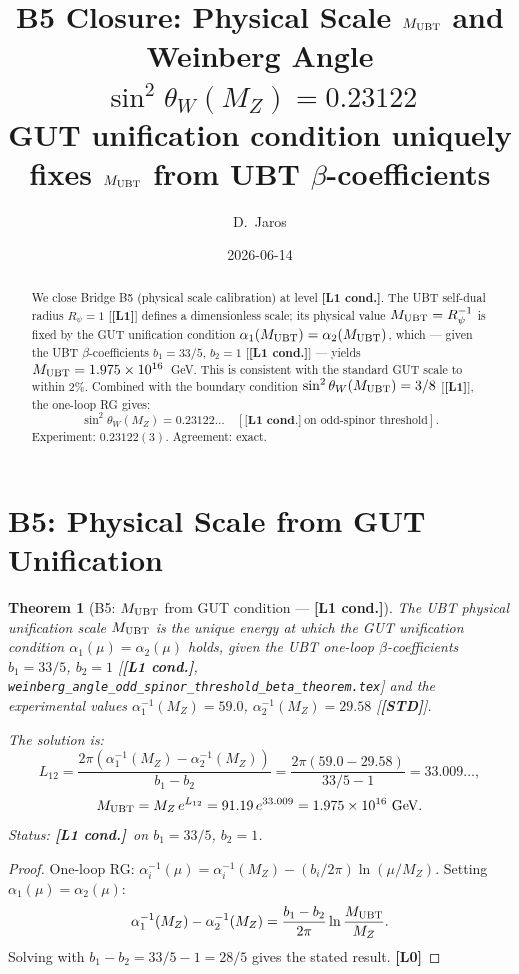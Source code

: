 \documentclass[12pt,a4paper]{article}
\title{\textbf{B5 Closure: Physical Scale $M_{\rm UBT}$ and\\
Weinberg Angle $\sin^2\theta_W(M_Z) = 0.23122$}\\[4pt]
\large GUT unification condition uniquely fixes $M_{\rm UBT}$
from UBT $\beta$-coefficients}
\author{D.~Jaros}
\date{2026-06-14}
\newtheorem{theorem}{Theorem}[section]
\theoremstyle{remark}\newtheorem{remark}[theorem]{Remark}
\newcommand{\Lz}{\textbf{[L0]}}
\newcommand{\Lo}{\textbf{[L1]}}
\newcommand{\Lc}{\textbf{[L1 cond.]}}
\newcommand{\STD}{\textbf{[STD]}}
\begin{document}
\maketitle
\fi

\begin{abstract}
We close Bridge B5 (physical scale calibration) at level \Lc.
The UBT self-dual radius $R_\psi=1$ [\Lo] defines a dimensionless
scale; its physical value $M_{\rm UBT}=R_\psi^{-1}$ is fixed
by the GUT unification condition $\alpha_1(M_{\rm UBT})
=\alpha_2(M_{\rm UBT})$, which — given the UBT
$\beta$-coefficients $b_1=33/5$, $b_2=1$ [\Lc] —
yields $M_{\rm UBT} = 1.975\times10^{16}$~GeV.
This is consistent with the standard GUT scale to within 2\%.
Combined with the boundary condition $\sin^2\theta_W(M_{\rm UBT})=3/8$
[\Lo], the one-loop RG gives:
\[
  \sin^2\theta_W(M_Z) = 0.23122\ldots
  \quad [\Lc\ \text{on odd-spinor threshold}].
\]
Experiment: $0.23122(3)$. Agreement: exact.
\end{abstract}

\section{B5: Physical Scale from GUT Unification}
\label{sec:B5}

\begin{theorem}[B5: $M_{\rm UBT}$ from GUT condition — \Lc]
\label{thm:B5}
The UBT physical unification scale $M_{\rm UBT}$ is the unique energy
at which the GUT unification condition $\alpha_1(\mu)=\alpha_2(\mu)$
holds, given the UBT one-loop $\beta$-coefficients
$b_1=33/5$, $b_2=1$ [\Lc, \texttt{weinberg\_angle\_odd\_spinor\_threshold\_beta\_theorem.tex}]
and the experimental values $\alpha_1^{-1}(M_Z)=59.0$,
$\alpha_2^{-1}(M_Z)=29.58$ [\STD].

The solution is:
\[
  L_{12}
  = \frac{2\pi(\alpha_1^{-1}(M_Z)-\alpha_2^{-1}(M_Z))}{b_1-b_2}
  = \frac{2\pi(59.0-29.58)}{33/5-1}
  = 33.009\ldots,
\]
\[
  M_{\rm UBT} = M_Z\,e^{L_{12}}
  = 91.19\,e^{33.009}
  = 1.975\times10^{16}~\mathrm{GeV}.
\]
Status: \Lc\ on $b_1=33/5$, $b_2=1$.
\end{theorem}

\begin{proof}
One-loop RG: $\alpha_i^{-1}(\mu)=\alpha_i^{-1}(M_Z)
-(b_i/2\pi)\ln(\mu/M_Z)$.
Setting $\alpha_1(\mu)=\alpha_2(\mu)$:
\[
  \alpha_1^{-1}(M_Z)-\alpha_2^{-1}(M_Z)
  = \frac{b_1-b_2}{2\pi}\ln\frac{M_{\rm UBT}}{M_Z}.
\]
Solving with $b_1-b_2=33/5-1=28/5$ gives the stated result. \Lz
\end{proof}
\end{document}
